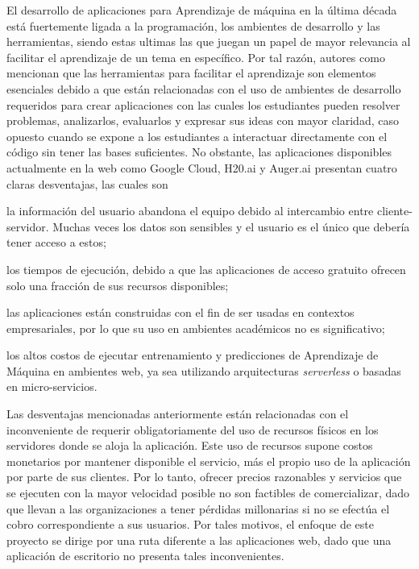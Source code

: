 El desarrollo de aplicaciones para Aprendizaje de máquina en la última década está fuertemente ligada a la programación, los ambientes de desarrollo y las herramientas, siendo estas ultimas las que juegan un papel de mayor relevancia al facilitar el aprendizaje de un tema en específico. Por tal razón, autores como \textcite{Francis1983, Salleh2013} mencionan que las herramientas para facilitar el aprendizaje son elementos esenciales debido a que están relacionadas con el uso de ambientes de desarrollo requeridos para crear aplicaciones con las cuales los estudiantes pueden resolver problemas, analizarlos, evaluarlos y expresar sus ideas con mayor claridad, caso opuesto cuando se expone a los estudiantes a interactuar directamente con el código sin tener las bases suficientes. No obstante, las aplicaciones disponibles actualmente en la web como Google Cloud, H20.ai y Auger.ai presentan cuatro claras desventajas, las cuales son 
\begin{seriate}
    \item la información del usuario abandona el equipo debido al intercambio entre cliente-servidor. Muchas veces los datos son sensibles y el usuario es el único que debería tener acceso a estos;
    \item los tiempos de ejecución, debido a que las aplicaciones de acceso gratuito ofrecen solo una fracción de sus recursos disponibles;
    \item las aplicaciones están construidas con el fin de ser usadas en contextos empresariales, por lo que su uso en ambientes académicos no es significativo;
    \item los altos costos de ejecutar entrenamiento y predicciones de Aprendizaje de Máquina en ambientes web, ya sea utilizando arquitecturas \textit{serverless} o basadas en micro-servicios.
\end{seriate}

Las desventajas mencionadas anteriormente están relacionadas con el inconveniente de requerir obligatoriamente del uso de recursos físicos en los servidores donde se aloja la aplicación. Este uso de recursos supone costos monetarios por mantener disponible el servicio, más el propio uso de la aplicación por parte de sus clientes. Por lo tanto, ofrecer precios razonables y servicios que se ejecuten con la mayor velocidad posible no son factibles de comercializar, dado que llevan a las organizaciones a tener pérdidas millonarias si no se efectúa el cobro correspondiente a sus usuarios. Por tales motivos, el enfoque de este proyecto se dirige por una ruta diferente a las aplicaciones web, dado que una aplicación de escritorio no presenta tales inconvenientes.





